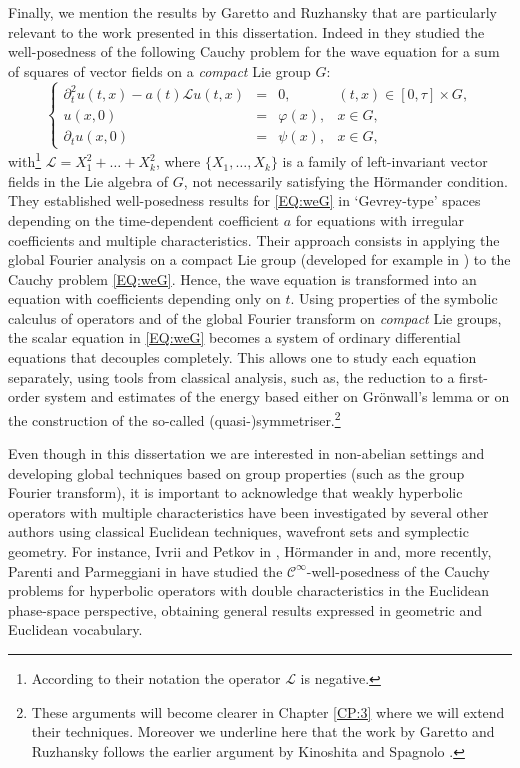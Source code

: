 \documentclass[12pt,oneside,a4paper]{book}
\numberwithin{equation}{section}     %
\theoremstyle{plain}
\theoremstyle{definition}
\newcommand{\slp}{{\mathcal L}}
\begin{document}
Finally, we mention the results by Garetto and Ruzhansky that are particularly relevant to the work presented in this dissertation. Indeed in \cite{GR2015} they studied the well-posedness of the following Cauchy problem for the wave equation for a sum of squares of vector fields on a \textit{compact} Lie group $G$:
\begin{equation}\label{EQ:weG}
\left\{\begin{array}{rclc}
\partial ^2_{t}u(t,x)-a(t)\slp u(t,x)	&=&0,			&(t,x)\in [0,\tau]\times G,\\
u(x,0)	&=&\varphi(x),	&x\in G,\\
\partial _t u(x,0)	&=&\psi(x),		&x\in G,
\end{array}\right.
\end{equation}  
with\footnote{According to their notation the operator $\slp$ is negative.} $\slp=X^2_1+\dots+X_k^2$, where $\{X_1,\dots,X_k\}$ is a family of left-invariant vector fields in the Lie algebra of $G$, not necessarily satisfying the H\"ormander condition. They established well-posedness results for \eqref{EQ:weG} in `Gevrey-type' spaces depending on the time-dependent coefficient $a$ for equations with irregular coefficients and multiple characteristics. Their approach consists in applying the global Fourier analysis on a compact Lie group (developed for example in \cite{T1986,RT2009}) to the Cauchy problem \eqref{EQ:weG}. Hence, the wave equation is transformed into an equation with coefficients depending only on $t$. Using properties of the symbolic calculus of operators and of the global Fourier transform on \textit{compact} Lie groups, the scalar equation in \eqref{EQ:weG} becomes a system of ordinary differential equations that decouples completely. This allows one to study each equation separately, using tools from classical analysis, such as, the reduction to a first-order system and estimates of the energy based either on Gr\"onwall's lemma or on the construction of the so-called (quasi-)symmetriser.\footnote{These arguments will become clearer in Chapter \ref{CP:3} where we will extend their techniques. Moreover we underline here that the work by Garetto and Ruzhansky follows the earlier argument by Kinoshita and Spagnolo \cite{KS2006}.}

Even though in this dissertation we are interested in non-abelian settings and developing global techniques based on group properties (such as the group Fourier transform), it is important to acknowledge that weakly hyperbolic operators with multiple characteristics have been investigated by several other authors using classical Euclidean techniques, wavefront sets and symplectic geometry. For instance, Ivrii and Petkov in \cite{IP1974}, H\"ormander in \cite{H1977} and, more recently, Parenti and Parmeggiani in \cite{PP2004,PP2009} have studied the $\mathcal{C}^\infty$-well-posedness of the Cauchy problems for hyperbolic operators with double characteristics in the Euclidean phase-space perspective, obtaining general results expressed in geometric and Euclidean vocabulary. 
\end{document}
